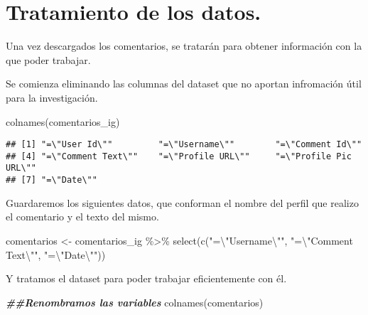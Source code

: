 \documentclass[
]{article}
\newenvironment{Shaded}{\begin{snugshade}}{\end{snugshade}}
\newcommand{\DocumentationTok}[1]{\textcolor[rgb]{0.56,0.35,0.01}{\textbf{\textit{#1}}}}
\newcommand{\FunctionTok}[1]{\textcolor[rgb]{0.00,0.00,0.00}{#1}}
\newcommand{\NormalTok}[1]{#1}
\newcommand{\OtherTok}[1]{\textcolor[rgb]{0.56,0.35,0.01}{#1}}
\newcommand{\SpecialCharTok}[1]{\textcolor[rgb]{0.00,0.00,0.00}{#1}}
\newcommand{\StringTok}[1]{\textcolor[rgb]{0.31,0.60,0.02}{#1}}
\begin{document}
\hypertarget{tratamiento-de-los-datos.}{%
\section{Tratamiento de los datos.}\label{tratamiento-de-los-datos.}}

Una vez descargados los comentarios, se tratarán para obtener
información con la que poder trabajar.

Se comienza eliminando las columnas del dataset que no aportan
infromación útil para la investigación.

\begin{Shaded}
\begin{Highlighting}[]
\FunctionTok{colnames}\NormalTok{(comentarios\_ig)}
\end{Highlighting}
\end{Shaded}

\begin{verbatim}
## [1] "=\"User Id\""         "=\"Username\""        "=\"Comment Id\""     
## [4] "=\"Comment Text\""    "=\"Profile URL\""     "=\"Profile Pic URL\""
## [7] "=\"Date\""
\end{verbatim}

Guardaremos los siguientes datos, que conforman el nombre del perfil que
realizo el comentario y el texto del mismo.

\begin{Shaded}
\begin{Highlighting}[]
\NormalTok{comentarios }\OtherTok{\textless{}{-}}\NormalTok{ comentarios\_ig }\SpecialCharTok{\%\textgreater{}\%} \FunctionTok{select}\NormalTok{(}\FunctionTok{c}\NormalTok{(}\StringTok{"=}\SpecialCharTok{\textbackslash{}"}\StringTok{Username}\SpecialCharTok{\textbackslash{}"}\StringTok{"}\NormalTok{, }\StringTok{"=}\SpecialCharTok{\textbackslash{}"}\StringTok{Comment Text}\SpecialCharTok{\textbackslash{}"}\StringTok{"}\NormalTok{, }\StringTok{"=}\SpecialCharTok{\textbackslash{}"}\StringTok{Date}\SpecialCharTok{\textbackslash{}"}\StringTok{"}\NormalTok{))}
\end{Highlighting}
\end{Shaded}

Y tratamos el dataset para poder trabajar eficientemente con él.

\begin{Shaded}
\begin{Highlighting}[]
\DocumentationTok{\#\#Renombramos las variables}
\FunctionTok{colnames}\NormalTok{(comentarios)}
\end{Highlighting}
\end{Shaded}
\end{document}
